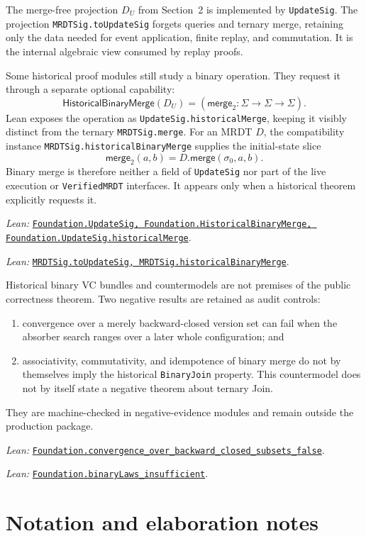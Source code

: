 \documentclass[11pt]{article}
\theoremstyle{definition}
\newcommand{\State}{\Sigma}
\newcommand{\init}{\sigma_0}
\newcommand{\merge}{\mathsf{merge}}
\newcommand{\lean}[1]{\texttt{#1}}
\newcommand{\src}[2]{\href{../../#1}{\texttt{#2}}}
\newcommand{\anchor}[2]{\par\smallskip\noindent\emph{Lean: }\src{#1}{#2}.}
\begin{document}
The merge-free projection $D_U$ from Section~2 is implemented by
\lean{UpdateSig}. The projection
\lean{MRDTSig.toUpdateSig} forgets queries and ternary merge, retaining only
the data needed for event application, finite replay, and commutation. It is
the internal algebraic view consumed by replay proofs.

Some historical proof modules still study a binary operation. They request it
through a separate optional capability:
\[
 \mathsf{HistoricalBinaryMerge}(D_U)
   = (\merge_2:\State\to\State\to\State).
\]
Lean exposes the operation as \lean{UpdateSig.historicalMerge}, keeping it
visibly distinct from the ternary \lean{MRDTSig.merge}.
For an MRDT $D$, the compatibility instance
\lean{MRDTSig.historicalBinaryMerge} supplies the initial-state slice
\[
  \merge_2(a,b)=D.\merge(\init,a,b).
\]
Binary merge is therefore neither a field of \lean{UpdateSig} nor part of the
live execution or \lean{VerifiedMRDT} interfaces. It appears only when a
historical theorem explicitly requests it.
\anchor{Sal/MRDTs/Framework/Base/UpdateSignature.lean}
  {Foundation.UpdateSig, Foundation.HistoricalBinaryMerge,
   Foundation.UpdateSig.historicalMerge}
\anchor{Sal/MRDTs/Framework/Signature.lean}
  {MRDTSig.toUpdateSig, MRDTSig.historicalBinaryMerge}

Historical binary VC bundles and countermodels are not premises of the public
correctness theorem. Two negative results are retained as audit controls:
\begin{enumerate}
\item convergence over a merely backward-closed version set can fail when the
absorber search ranges over a later whole configuration; and
\item associativity, commutativity, and idempotence of binary merge do not by
themselves imply the historical \lean{BinaryJoin} property. This countermodel
does not by itself state a negative theorem about ternary Join.
\end{enumerate}
They are machine-checked in negative-evidence modules and remain outside the
production package.
\anchor{Sal/MRDTs/Metatheory/Join/SetRelativeReplay.lean}
  {Foundation.convergence\_over\_backward\_closed\_subsets\_false}
\anchor{Sal/MRDTs/Metatheory/Join/SetRelativeReplay.lean}
  {Foundation.binaryLaws\_insufficient}

\section{Notation and elaboration notes}
\end{document}
